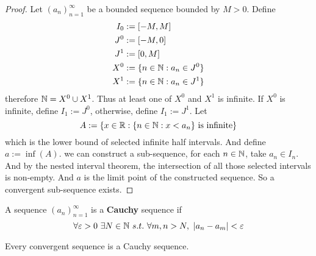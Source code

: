 \documentclass[11pt]{article}
\newcommand{\seq}[2]{({#1}_{#2})_{{#2}=1}^\infty}
\begin{document}
        \begin{proof}
            Let $\seq{a}{n}$ be a bounded sequence bounded by $M > 0$. Define
            \begin{align}
                I_0 &:= [-M, M] \\
                J^0 &:= [-M, 0] \\
                J^1 &:= [0, M] \\
                X^0 &:= \{n \in \mathbb{N}: a_n \in J^0\} \\
                X^1 &:= \{n \in \mathbb{N}: a_n \in J^1\}
            \end{align}
            therefore $\mathbb{N} = X^0 \cup X^1$. Thus at least one of $X^0$ and $X^1$ is infinite. If $X^0$ is infinite, define $I_1 := J^0$, otherwise, define $I_1 := J^1$. Let 
            \begin{equation}
                A := \{x \in \mathbb{R}: \{n \in \mathbb{N}: x < a_n\} \text{{ is infinite}} \}
            \end{equation}
            which is the lower bound of selected infinite half intervals. And define $a:= \inf(A)$. we can construct a sub-sequence, for each $n \in \mathbb{N}$, take $a_n \in I_n$. And by the nested interval theorem, the intersection of all those selected intervals is non-empty. And $a$ is the limit point of the constructed sequence. So a convergent sub-sequence exists.
        \end{proof}
        
        \begin{definition}
            A sequence $\seq{a}{n}$ is a \textbf{Cauchy} sequence if 
            \begin{equation}
                \forall \varepsilon > 0\ \exists N \in \N\ s.t.\ \forall m, n > N,\ |a_n - a_m| < \varepsilon
            \end{equation}
        \end{definition}
        
        \begin{theorem}
            Every convergent sequence is a Cauchy sequence.
        \end{theorem}
\end{document}
